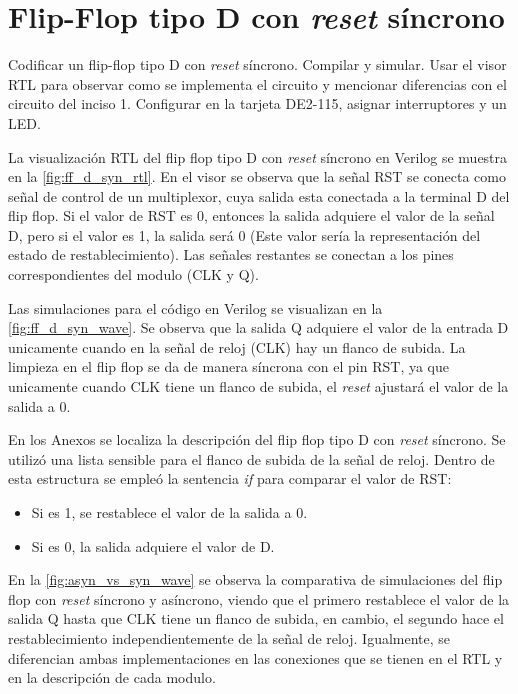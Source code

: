 \section{Flip-Flop tipo D con \textit{reset} síncrono \label{sec:s2}}

\begin{center}
	\begin{minipage}{12cm}
		\begin{tcolorbox}[title=Actividad 2]
			Codificar un flip-flop tipo D con \textit{reset} síncrono. Compilar y simular. Usar el visor RTL para observar como se implementa el circuito y mencionar diferencias con el circuito del inciso 1. Configurar en la tarjeta DE2-115, asignar interruptores y un LED.
		\end{tcolorbox}	
	\end{minipage}
\end{center}

La visualización RTL del flip flop tipo D con \textit{reset} síncrono en Verilog se muestra en la \autoref{fig:ff_d_syn_rtl}. En el visor se observa que la señal RST se conecta como señal de control de un multiplexor, cuya salida esta conectada a la terminal D del flip flop. Si el valor de RST es 0, entonces la salida adquiere el valor de la señal D, pero si el valor es 1, la salida será 0 (Este valor sería la representación del estado de restablecimiento). Las señales restantes se conectan a los pines correspondientes del modulo (CLK y Q).

Las simulaciones para el código en Verilog se visualizan en la \autoref{fig:ff_d_syn_wave}. Se observa que la salida Q adquiere el valor de la entrada D unicamente cuando en la señal de reloj (CLK) hay un flanco de subida. La limpieza en el flip flop se da de manera síncrona con el pin RST, ya que unicamente cuando CLK tiene un flanco de subida, el \textit{reset} ajustará el valor de la salida a 0.

En los Anexos se localiza la descripción del flip flop tipo D con \textit{reset} síncrono. Se utilizó una lista sensible para el flanco de subida de la señal de reloj. Dentro de esta estructura se empleó la sentencia \textit{if} para comparar el valor de RST: 
\begin{itemize}
	\item Si es 1, se restablece el valor de la salida a 0. 
	\item Si es 0, la salida adquiere el valor de D.
\end{itemize}

En la \autoref{fig:asyn_vs_syn_wave} se observa la comparativa de simulaciones del flip flop con \textit{reset} síncrono y asíncrono, viendo que el primero restablece el valor de la salida Q hasta que CLK tiene un flanco de subida, en cambio, el segundo hace el restablecimiento independientemente de la señal de reloj. Igualmente, se diferencian ambas implementaciones en las conexiones que se tienen en el RTL y en la descripción de cada modulo.

